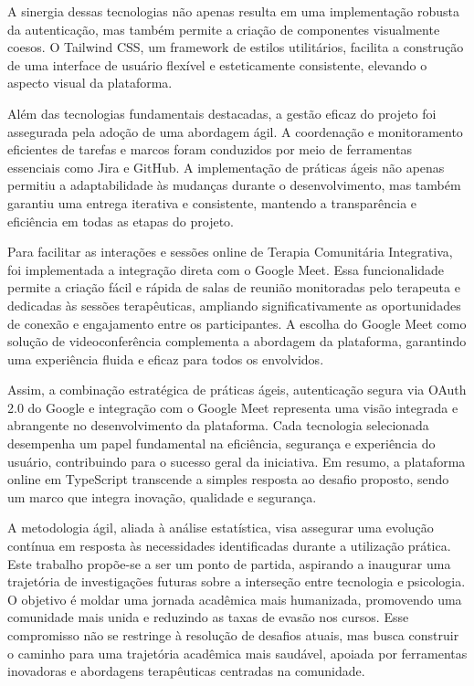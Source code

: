 A sinergia dessas tecnologias não apenas resulta em uma implementação robusta da autenticação, mas também permite a criação de componentes visualmente coesos. O Tailwind CSS, um framework de estilos utilitários, facilita a construção de uma interface de usuário flexível e esteticamente consistente, elevando o aspecto visual da plataforma.

Além das tecnologias fundamentais destacadas, a gestão eficaz do projeto foi assegurada pela adoção de uma abordagem ágil. A coordenação e monitoramento eficientes de tarefas e marcos foram conduzidos por meio de ferramentas essenciais como Jira e GitHub. A implementação de práticas ágeis não apenas permitiu a adaptabilidade às mudanças durante o desenvolvimento, mas também garantiu uma entrega iterativa e consistente, mantendo a transparência e eficiência em todas as etapas do projeto.

Para facilitar as interações e sessões online de Terapia Comunitária Integrativa, foi implementada a integração direta com o Google Meet. Essa funcionalidade permite a criação fácil e rápida de salas de reunião monitoradas pelo terapeuta e dedicadas às sessões terapêuticas, ampliando significativamente as oportunidades de conexão e engajamento entre os participantes. A escolha do Google Meet como solução de videoconferência complementa a abordagem da plataforma, garantindo uma experiência fluida e eficaz para todos os envolvidos.

Assim, a combinação estratégica de práticas ágeis, autenticação segura via OAuth 2.0 do Google e integração com o Google Meet representa uma visão integrada e abrangente no desenvolvimento da plataforma. Cada tecnologia selecionada desempenha um papel fundamental na eficiência, segurança e experiência do usuário, contribuindo para o sucesso geral da iniciativa. Em resumo, a plataforma online em TypeScript transcende a simples resposta ao desafio proposto, sendo um marco que integra inovação, qualidade e segurança.

A metodologia ágil, aliada à análise estatística, visa assegurar uma evolução contínua em resposta às necessidades identificadas durante a utilização prática. Este trabalho propõe-se a ser um ponto de partida, aspirando a inaugurar uma trajetória de investigações futuras sobre a interseção entre tecnologia e psicologia. O objetivo é moldar uma jornada acadêmica mais humanizada, promovendo uma comunidade mais unida e reduzindo as taxas de evasão nos cursos. Esse compromisso não se restringe à resolução de desafios atuais, mas busca construir o caminho para uma trajetória acadêmica mais saudável, apoiada por ferramentas inovadoras e abordagens terapêuticas centradas na comunidade.




